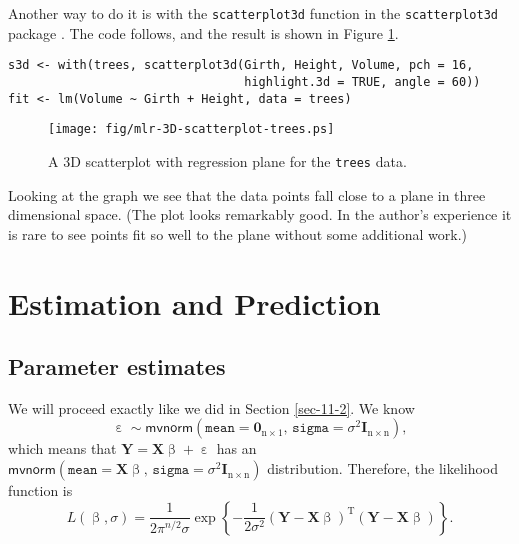 Another way to do it is with the \texttt{scatterplot3d} function in the
\texttt{scatterplot3d} package \cite{scatterplot3d}. The code follows, and
the result is shown in Figure \ref{fig-3D-scatterplot-trees}.

\begin{verbatim}
s3d <- with(trees, scatterplot3d(Girth, Height, Volume, pch = 16, 
                                 highlight.3d = TRUE, angle = 60))
fit <- lm(Volume ~ Girth + Height, data = trees)
\end{verbatim}

\begin{figure}[ht!]
\centering
\texttt{[image: fig/mlr-3D-scatterplot-trees.ps]}
\caption[3D scatterplot with regression plane for the \texttt{trees} data]{\label{fig-3D-scatterplot-trees}\small A 3D scatterplot with regression plane for the \texttt{trees} data.}
\end{figure}

Looking at the graph we see that the data points fall close to a plane
in three dimensional space. (The plot looks remarkably good. In the
author's experience it is rare to see points fit so well to the plane
without some additional work.)

\section{Estimation and Prediction}
\label{sec-12-2}

\subsection{Parameter estimates}
\label{sec-12-2-1}

We will proceed exactly like we did in Section \ref{sec-11-2}. We know
\begin{equation}
\upepsilon\sim\mathsf{mvnorm}\left(\mathtt{mean}=\mathbf{0}_{\mathrm{n}\times1},\,\mathtt{sigma}=\sigma^{2}\mathbf{I}_{\mathrm{n}\times\mathrm{n}}\right),
\end{equation}
which means that \(\mathbf{Y}=\mathbf{X}\upbeta+\upepsilon\) has an \(\mathsf{mvnorm}\left(\mathtt{mean}=\mathbf{X}\upbeta,\,\mathtt{sigma}=\sigma^{2}\mathbf{I}_{\mathrm{n}\times\mathrm{n}}\right)\) distribution. Therefore, the likelihood function  is
\begin{equation}
L(\upbeta,\sigma)=\frac{1}{2\pi^{n/2}\sigma}\exp\left\{ -\frac{1}{2\sigma^{2}}\left(\mathbf{Y}-\mathbf{X}\upbeta\right)^{\mathrm{T}}\left(\mathbf{Y}-\mathbf{X}\upbeta\right)\right\}.
\end{equation}

